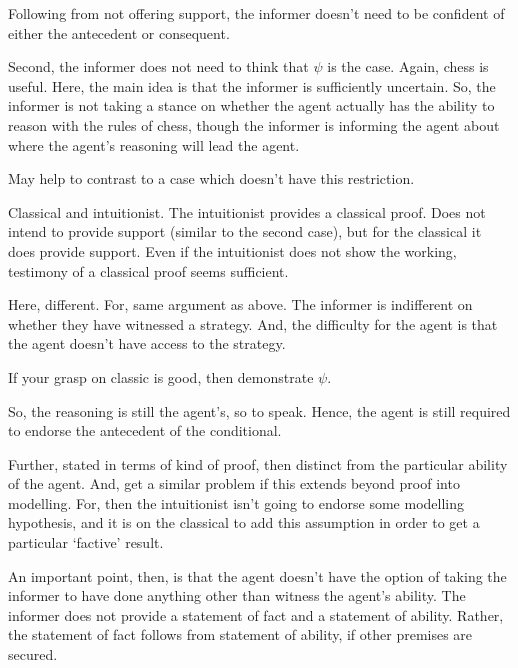 \documentclass[10pt]{article}
\newcommand{\hozlinedash}[0]{%
  \noindent\hdashrule[0.5ex][c]{\textwidth}{.1pt}{2.5pt}
}
\begin{document}
\begin{note}
  Following from not offering support, the informer doesn't need to be confident of either the antecedent or consequent.

  Second, the informer does not need to think that \(\psi\) is the case.
  Again, chess is useful.
  Here, the main idea is that the informer is sufficiently uncertain.
  So, the informer is not taking a stance on whether the agent actually has the ability to reason with the rules of chess, though the informer is informing the agent about where the agent's reasoning will lead the agent.
\end{note}

\begin{note}
  May help to contrast to a case which doesn't have this restriction.

  Classical and intuitionist.
  The intuitionist provides a classical proof.
  Does not intend to provide support (similar to the second case), but for the classical it does provide support.
  Even if the intuitionist does not show the working, testimony of a classical proof seems sufficient.

  Here, different.
  For, same argument as above.
  The informer is indifferent on whether they have witnessed a strategy.
  And, the difficulty for the agent is that the agent doesn't have access to the strategy.

  If your grasp on classic is good, then demonstrate \(\psi\).

  So, the reasoning is still the agent's, so to speak.
  Hence, the agent is still required to endorse the antecedent of the conditional.

  Further, stated in terms of kind of proof, then distinct from the particular ability of the agent.
  And, get a similar problem if this extends beyond proof into modelling.
  For, then the intuitionist isn't going to endorse some modelling hypothesis, and it is on the classical to add this assumption in order to get a particular `factive' result.

  \hozlinedash

  An important point, then, is that the agent doesn't have the option of taking the informer to have done anything other than witness the agent's ability.
  The informer does not provide a statement of fact and a statement of ability.
  Rather, the statement of fact follows from statement of ability, if other premises are secured.


\end{note}
\end{document}
